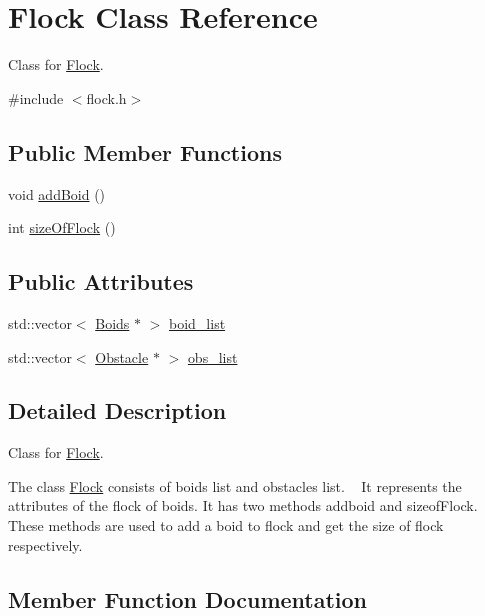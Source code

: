 \hypertarget{class_flock}{}\section{Flock Class Reference}
\label{class_flock}


Class for \mbox{\hyperlink{class_flock}{Flock}}.  




{\ttfamily \#include $<$flock.\+h$>$}

\subsection*{Public Member Functions}
\begin{DoxyCompactItemize}
\item 
void \mbox{\hyperlink{class_flock_a73c8fbefc577353667562477b7bbe878}{add\+Boid}} ()
\item 
int \mbox{\hyperlink{class_flock_a7d6cbb42cc06cf8d0995f4a9113b79c6}{size\+Of\+Flock}} ()
\end{DoxyCompactItemize}
\subsection*{Public Attributes}
\begin{DoxyCompactItemize}
\item 
std\+::vector$<$ \mbox{\hyperlink{class_boids}{Boids}} $\ast$ $>$ \mbox{\hyperlink{class_flock_a2a8a301e32d7ba53250c760b0a586fd9}{boid\+\_\+list}}
\item 
std\+::vector$<$ \mbox{\hyperlink{class_obstacle}{Obstacle}} $\ast$ $>$ \mbox{\hyperlink{class_flock_a3119c5a155c620f89111b7d6e1121b9f}{obs\+\_\+list}}
\end{DoxyCompactItemize}


\subsection{Detailed Description}
Class for \mbox{\hyperlink{class_flock}{Flock}}. 

The class \mbox{\hyperlink{class_flock}{Flock}} consists of boids list and obstacles list. ~\newline
It represents the attributes of the flock of boids. It has two methods addboid and sizeof\+Flock. These methods are used to add a boid to flock and get the size of flock respectively. 

\subsection{Member Function Documentation}
\mbox{\label{class_flock_a73c8fbefc577353667562477b7bbe878}} 
